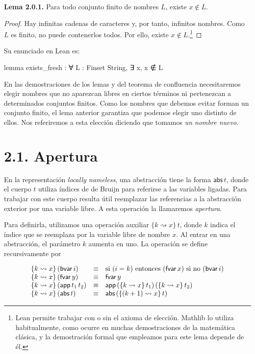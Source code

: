 \documentclass[
  spanish,
  letterpaper,
  DIV=11,
  numbers=noendperiod]{scrreprt}
\newenvironment{Shaded}{\begin{snugshade}}{\end{snugshade}}
\newcommand{\KeywordTok}[1]{\textcolor[rgb]{0.00,0.23,0.31}{\textbf{#1}}}
\newcommand{\NormalTok}[1]{\textcolor[rgb]{0.00,0.23,0.31}{#1}}
\renewcommand{\NormalTok}[1]{\textcolor[HTML]{000000}{#1}}
\renewcommand{\KeywordTok}[1]{\textcolor[HTML]{0000FF}{#1}}
\theoremstyle{remark}
\begin{document}
\textbf{Lema 2.0.1.} Para todo conjunto finito de nombres \(L\), existe
\(x\notin L\).

\begin{proof}
Hay infinitas cadenas de caracteres y, por tanto, infinitos nombres.
Como \(L\) es finito, no puede contenerlos todos. Por ello, existe
\(x\notin L\).\footnote{Lean permite trabajar con o sin el axioma de
  elección. Mathlib lo utiliza habitualmente, como ocurre en muchas
  demostraciones de la matemática clásica, y la demostración formal que
  empleamos para este lema depende de él.}
\end{proof}

Su enunciado en Lean es:

\begin{Shaded}
\begin{Highlighting}[]
\KeywordTok{lemma}\NormalTok{ exists\_fresh : ∀ L : Finset String,}
\NormalTok{    ∃ x, x ∉ L}
\end{Highlighting}
\end{Shaded}

En las demostraciones de los lemas y del teorema de confluencia
necesitaremos elegir nombres que no aparezcan libres en ciertos términos
ni pertenezcan a determinados conjuntos finitos. Como los nombres que
debemos evitar forman un conjunto finito, el lema anterior garantiza que
podemos elegir uno distinto de ellos. Nos referiremos a esta elección
diciendo que tomamos \emph{un nombre nuevo}.

\section{2.1. Apertura}\label{apertura}

En la representación \emph{locally nameless}, una abstracción tiene la
forma \(\mathsf{abs} \, t\), donde el cuerpo \(t\) utiliza índices de de
Bruijn para referirse a las variables ligadas. Para trabajar con este
cuerpo resulta útil reemplazar las referencias a la abstracción exterior
por una variable libre. A esta operación la llamaremos \emph{apertura}.

Para definirla, utilizamos una operación auxiliar
\(\{k\rightsquigarrow x\}\,t\), donde \(k\) indica el índice que se
reemplaza por la variable libre de nombre \(x\). Al entrar en una
abstracción, el parámetro \(k\) aumenta en uno. La operación se define
recursivamente por

\[
\begin{array}{l c l}
\{k \rightsquigarrow x\} \, (\mathsf{bvar}\, i) & \equiv & \text{si } (i = k) \text{ entonces } (\mathsf{fvar}\, x) \text{ si no } (\mathsf{bvar}\, i) \\ 
\{k \rightsquigarrow x\} \, (\mathsf{fvar}\, y) & \equiv & \mathsf{fvar}\, y \\ 
\{k \rightsquigarrow x\} \, (\mathsf{app}\, t_1 \, t_2) & \equiv & \mathsf{app}\, (\{k \rightsquigarrow x \} \, t_1) \, (\{k \rightsquigarrow x\} \, t_2) \\ 
\{k \rightsquigarrow x\} \, (\mathsf{abs}\, t) & \equiv & \mathsf{abs}\, (\{(k + 1) \rightsquigarrow x\} \, t)
\end{array}
\]
\end{document}
